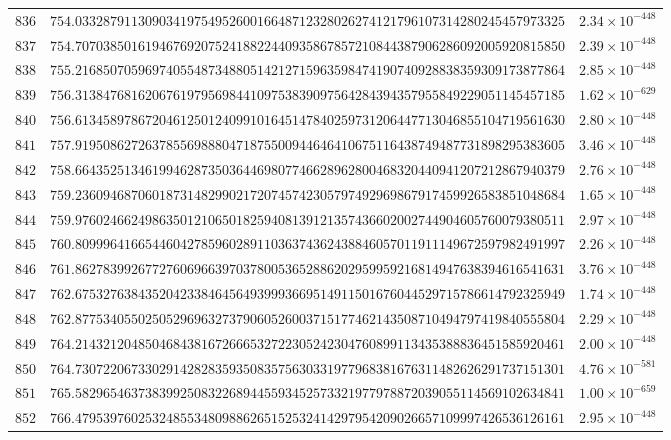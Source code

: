\documentclass[12pt,reqno]{amsart}
\theoremstyle{remark}
\begin{document}
\begin{longtable}{clc}
$836$ & $754.0332879113090341975495260016648712328026274121796107314280245457973325$ & $2.34\times 10^{-448}$ \\
$837$ & $754.7070385016194676920752418822440935867857210844387906286092005920815850$ & $2.39\times 10^{-448}$ \\
$838$ & $755.2168507059697405548734880514212715963598474190740928838359309173877864$ & $2.85\times 10^{-448}$ \\
$839$ & $756.3138476816206761979569844109753839097564284394357955849229051145457185$ & $1.62\times 10^{-629}$ \\
$840$ & $756.6134589786720461250124099101645147840259731206447713046855104719561630$ & $2.80\times 10^{-448}$ \\
$841$ & $757.9195086272637855698880471875500944646410675116438749487731898295383605$ & $3.46\times 10^{-448}$ \\
$842$ & $758.6643525134619946287350364469807746628962800468320440941207212867940379$ & $2.76\times 10^{-448}$ \\
$843$ & $759.2360946870601873148299021720745742305797492969867917459926583851048684$ & $1.65\times 10^{-448}$ \\
$844$ & $759.9760246624986350121065018259408139121357436602002744904605760079380511$ & $2.97\times 10^{-448}$ \\
$845$ & $760.8099964166544604278596028911036374362438846057011911149672597982491997$ & $2.26\times 10^{-448}$ \\
$846$ & $761.8627839926772760696639703780053652886202959959216814947638394616541631$ & $3.76\times 10^{-448}$ \\
$847$ & $762.6753276384352042338464564939993669514911501676044529715786614792325949$ & $1.74\times 10^{-448}$ \\
$848$ & $762.8775340550250529696327379060526003715177462143508710494797419840555804$ & $2.29\times 10^{-448}$ \\
$849$ & $764.2143212048504684381672666532722305242304760899113435388836451585920461$ & $2.00\times 10^{-448}$ \\
$850$ & $764.7307220673302914282835935083575630331977968381676311482626291737151301$ & $4.76\times 10^{-581}$ \\
$851$ & $765.5829654637383992508322689445593452573321977978872039055114569102634841$ & $1.00\times 10^{-659}$ \\
$852$ & $766.4795397602532485534809886265152532414297954209026657109997426536126161$ & $2.95\times 10^{-448}$ \\

\end{longtable}
\end{document}
